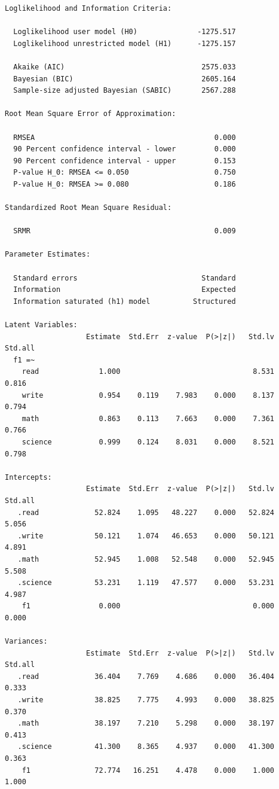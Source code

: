 \documentclass[
  letterpaper,
  DIV=11,
  numbers=noendperiod]{scrreprt}
\begin{document}
\begin{verbatim}
Loglikelihood and Information Criteria:

  Loglikelihood user model (H0)              -1275.517
  Loglikelihood unrestricted model (H1)      -1275.157
                                                      
  Akaike (AIC)                                2575.033
  Bayesian (BIC)                              2605.164
  Sample-size adjusted Bayesian (SABIC)       2567.288

Root Mean Square Error of Approximation:

  RMSEA                                          0.000
  90 Percent confidence interval - lower         0.000
  90 Percent confidence interval - upper         0.153
  P-value H_0: RMSEA <= 0.050                    0.750
  P-value H_0: RMSEA >= 0.080                    0.186

Standardized Root Mean Square Residual:

  SRMR                                           0.009

Parameter Estimates:

  Standard errors                             Standard
  Information                                 Expected
  Information saturated (h1) model          Structured

Latent Variables:
                   Estimate  Std.Err  z-value  P(>|z|)   Std.lv  Std.all
  f1 =~                                                                 
    read              1.000                               8.531    0.816
    write             0.954    0.119    7.983    0.000    8.137    0.794
    math              0.863    0.113    7.663    0.000    7.361    0.766
    science           0.999    0.124    8.031    0.000    8.521    0.798

Intercepts:
                   Estimate  Std.Err  z-value  P(>|z|)   Std.lv  Std.all
   .read             52.824    1.095   48.227    0.000   52.824    5.056
   .write            50.121    1.074   46.653    0.000   50.121    4.891
   .math             52.945    1.008   52.548    0.000   52.945    5.508
   .science          53.231    1.119   47.577    0.000   53.231    4.987
    f1                0.000                               0.000    0.000

Variances:
                   Estimate  Std.Err  z-value  P(>|z|)   Std.lv  Std.all
   .read             36.404    7.769    4.686    0.000   36.404    0.333
   .write            38.825    7.775    4.993    0.000   38.825    0.370
   .math             38.197    7.210    5.298    0.000   38.197    0.413
   .science          41.300    8.365    4.937    0.000   41.300    0.363
    f1               72.774   16.251    4.478    0.000    1.000    1.000
\end{verbatim}
\end{document}
